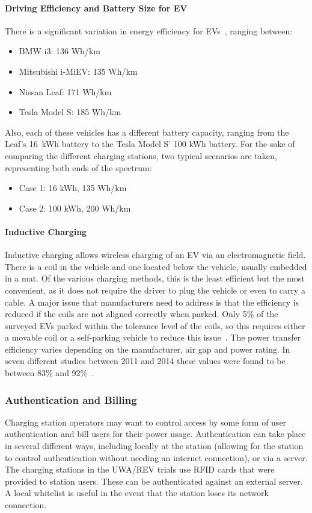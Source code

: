 \paragraph{Driving Efficiency and Battery Size for EV}
There is a significant variation in energy efficiency for EVs~\cite{australian_government_green_nodate}, ranging between:
\begin{itemize}
	\item BMW i3: 136 Wh/km
	\item Mitsubishi i-MiEV: 135 Wh/km
	\item Nissan Leaf: 171 Wh/km
	\item Tesla Model S: 185 Wh/km
\end{itemize}
Also, each of these vehicles has a different battery capacity, ranging from the Leaf's 16~kWh battery to the Tesla Model S' 100 kWh battery. For the sake of comparing the different charging stations, two typical scenarios are taken, representing both ends of the spectrum:
\begin{itemize}
	\item Case 1: 16 kWh, 135 Wh/km
	\item Case 2: 100 kWh, 200 Wh/km
\end{itemize}

\paragraph{Inductive Charging}
Inductive charging allows wireless charging of an EV via an electromagnetic field.  There is a coil in the vehicle and one located below the vehicle, usually embedded in a mat. Of the various charging methods, this is the least efficient but the most convenient, as it does not require the driver to plug the vehicle or even to carry a cable. A major issue that manufacturers need to address is that the efficiency is reduced if the coils are not aligned correctly when parked. Only 5\% of the surveyed EVs parked within the tolerance level of the coils, so this requires either a movable coil or a self-parking vehicle to reduce this issue~\cite{birrell_how_2015}. The power transfer efficiency varies depending on the manufacturer, air gap and power rating. In seven different studies between 2011 and 2014 these values were found to be between 83\% and 92\%~\cite{kalwar_inductively_2015}. 

\subsubsection{Authentication and Billing}
Charging station operators may want to control access by some form of user authentication and bill users for their power usage. Authentication can take place in several different ways, including locally at the station (allowing for the station to control authentication without needing an internet connection), or via a server. The charging stations in the UWA/REV trials use RFID cards that were provided to station users. These can be authenticated against an external server. A local whitelist is useful in the event that the station loses its network connection. 

